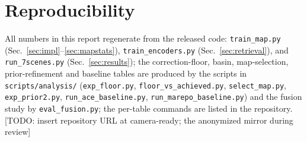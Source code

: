 \documentclass[journal]{IEEEtran}
\newcommand{\TODO}[1]{{\color{red}[TODO: #1]}}
\begin{document}
\section*{Reproducibility}
All numbers in this report regenerate from the released code:
\texttt{train\_map.py} (Sec.~\ref{sec:impl}--\ref{sec:mapstats}),
\texttt{train\_encoders.py} (Sec.~\ref{sec:retrieval}), and
\texttt{run\_7scenes.py} (Sec.~\ref{sec:results}); the correction-floor, basin, map-selection, prior-refinement and baseline tables are produced by the scripts in \texttt{scripts/analysis/} (\texttt{exp\_floor.py}, \texttt{floor\_vs\_achieved.py}, \texttt{select\_map.py}, \texttt{exp\_prior2.py}, \texttt{run\_ace\_baseline.py}, \texttt{run\_marepo\_baseline.py}) and the fusion study by \texttt{eval\_fusion.py}; the per-table commands are listed in the repository. \TODO{insert repository URL at camera-ready; the
anonymized mirror during review}



\end{document}
